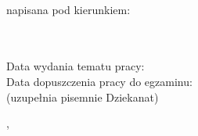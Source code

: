 {\degreename}\\[.5cm]


{napisana pod kierunkiem:} \\[.25cm]
{\normalsize\textbf\supname}\\[.25cm]
\normalsize{\departmentname}\\[1cm]
\vfill

\begin{flushleft}
Data wydania tematu pracy: \datetitle \\[.2cm]
Data dopuszczenia pracy do egzaminu: \dotfill\\
{\scriptsize (uzupełnia pisemnie Dziekanat)}
\end{flushleft}
\vfill
 \rm \large{\sffamily  \placesubmit, \yearsubmit}\\

\endgroup

